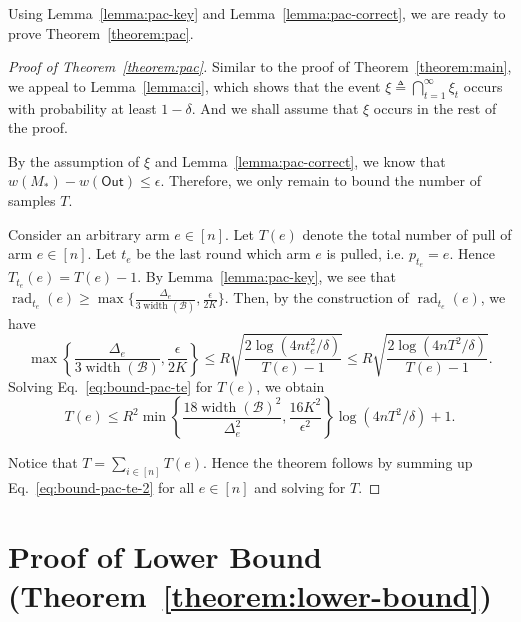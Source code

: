 \documentclass{article}
\newcommand{\B}{\mathcal B}
\DeclareMathOperator{\rank}{width}
\DeclareMathOperator{\rad}{rad}
\newcommand{\out}{\mathsf{Out}}
\begin{document}
Using Lemma~\ref{lemma:pac-key} and Lemma~\ref{lemma:pac-correct}, we are ready to prove Theorem~\ref{theorem:pac}.
\begin{proof}[Proof of Theorem~\ref{theorem:pac}]
Similar to the proof of Theorem~\ref{theorem:main}, we appeal to Lemma~\ref{lemma:ci}, which shows that the event $\xi \triangleq \bigcap_{t=1}^\infty \xi_t$ occurs with probability at least $1-\delta$.
And we shall assume that $\xi$ occurs in the rest of the proof.

By the assumption of $\xi$ and Lemma~\ref{lemma:pac-correct}, we know that $w(M_*)-w(\out) \le \epsilon$. Therefore, we only remain to bound the number of samples $T$.

Consider an arbitrary arm $e\in [n]$.
Let $T(e)$ denote the total number of pull of arm $e\in [n]$.
Let $t_e$ be the last round which arm $e$ is pulled, i.e. $p_{t_e} = e$. 
Hence $T_{t_e}(e) = T(e) - 1$.
By Lemma~\ref{lemma:pac-key}, we see that 
$\rad_{t_e}(e) \ge \max\{\frac{\Delta_e}{3\rank(\B)},\frac{\epsilon}{2K}\}$.
Then, by the construction of $\rad_{t_e}(e)$, we have
\begin{equation}
\max\left\{\frac{\Delta_e}{3\rank(\B)},\frac{\epsilon}{2K}\right\} \le 
R\sqrt{\frac{2\log\left(4n t_e^2/\delta\right)}{T(e)-1}} \le
R\sqrt{\frac{2\log\left(4n T^2/\delta\right)}{T(e)-1}}.
\label{eq:bound-pac-te}
\end{equation}
Solving Eq.~\eqref{eq:bound-pac-te} for $T(e)$, we obtain
\begin{equation}
\label{eq:bound-pac-te-2}
T(e) \le R^2\min\left\{\frac{18 \rank(\B)^2}{\Delta_e^2},\frac{16K^2}{\epsilon^2}\right\} \log(4nT^2/\delta)+1.
\end{equation}

Notice that $T=\sum_{i\in[n]} T(e)$. 
Hence the theorem follows by summing up Eq.~\eqref{eq:bound-pac-te-2} for all $e\in [n]$ and solving for $T$.
\end{proof}



\section{Proof of Lower Bound (Theorem~\ref{theorem:lower-bound})}
\label{section:lowerbound-proof}

\lowerbound*
\end{document}
